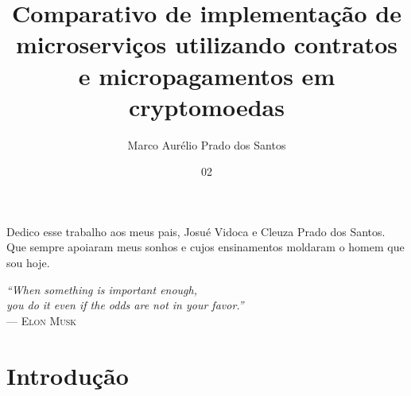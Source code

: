 \documentclass[tg]{ita}    %
\author{Marco Aurélio Prado dos Santos}{Vidoca}
\title{Comparativo de implementação de microserviços utilizando contratos e micropagamentos em cryptomoedas}
\date{02}{agosto}{2018}
\begin{document}
\maketitle

\begin{itadedication}
Dedico esse trabalho aos meus pais, Josué Vidoca e Cleuza Prado dos Santos. Que sempre apoiaram meus sonhos e cujos ensinamentos moldaram o homem que sou hoje.
\end{itadedication}

%

\thispagestyle{empty}
\ifhyperref{}\fi
\begin{flushright}
\begin{spacing}{1}
\mbox{}\vfill
{\sffamily\itshape
``When something is important enough,\\
you do it even if the odds are not in your favor.''\\}
--- \textsc{Elon Musk}
\end{spacing}
\end{flushright}

\begin{abstract}
\noindent

\end{abstract}

\begin{englishabstract}
\noindent

\end{englishabstract}





\tableofcontents

\mainmatter

\chapter{Introdução}

\end{document}
